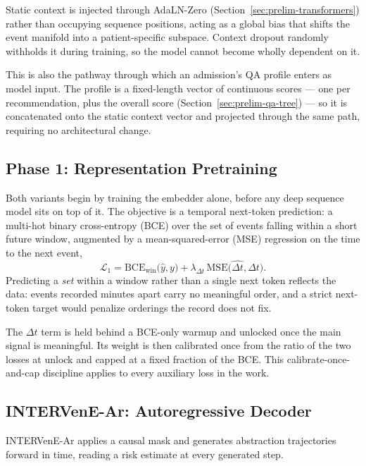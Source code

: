 Static context is injected through AdaLN-Zero (Section~\ref{sec:prelim-transformers}) rather than occupying sequence positions, acting as a global bias that shifts the event manifold into a patient-specific subspace. Context dropout randomly withholds it during training, so the model cannot become wholly dependent on it.

This is also the pathway through which an admission's QA profile enters as model input. The profile is a fixed-length vector of continuous scores --- one per recommendation, plus the overall score (Section~\ref{sec:prelim-qa-tree}) --- so it is concatenated onto the static context vector and projected through the same path, requiring no architectural change.

\subsection{Phase 1: Representation Pretraining}

Both variants begin by training the embedder alone, before any deep sequence model sits on top of it. The objective is a temporal next-token prediction: a multi-hot binary cross-entropy (BCE) over the set of events falling within a short future window, augmented by a mean-squared-error (MSE) regression on the time to the next event,
\begin{equation}
\mathcal{L}_1 = \mathrm{BCE}_{\text{win}}\big(\hat{y}, y\big) + \lambda_{\Delta t}\,\mathrm{MSE}\big(\widehat{\Delta t}, \Delta t\big).
\end{equation}
Predicting a \emph{set} within a window rather than a single next token reflects the data: events recorded minutes apart carry no meaningful order, and a strict next-token target would penalize orderings the record does not fix.

The $\Delta t$ term is held behind a BCE-only warmup and unlocked once the main signal is meaningful. Its weight is then calibrated once from the ratio of the two losses at unlock and capped at a fixed fraction of the BCE. This calibrate-once-and-cap discipline applies to every auxiliary loss in the work.

\subsection{INTERVenE-Ar: Autoregressive Decoder}

INTERVenE-Ar applies a causal mask and generates abstraction trajectories forward in time, reading a risk estimate at every generated step.

